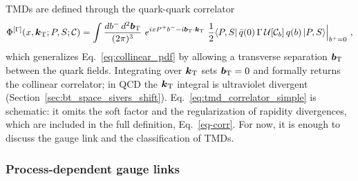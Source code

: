TMDs are defined through the quark-quark correlator
\begin{equation}
  \Phi^{[\Gamma]}(x,\boldsymbol{k}_{\mathrm T};P,S;\mathcal{C}) = \int\frac{db^-\,d^2\boldsymbol{b}_{\mathrm T}}{(2\pi)^3}\ e^{ixP^+b^- - i\boldsymbol{b}_{\mathrm T}{\cdot}\boldsymbol{k}_{\mathrm T}}\
  \frac{1}{2}\langle P,S|\,\bar{q}(0)\,\Gamma\,\mathcal{U}[\mathcal{C}_b]\,q(b)\,|P,S\rangle\Big|_{b^+=0} \ ,
  \label{eq:tmd_correlator_simple}
\end{equation}
which generalizes Eq.~\eqref{eq:collinear_pdf} by allowing a transverse separation $\boldsymbol{b}_{\mathrm T}$ between the quark fields. Integrating over $\boldsymbol{k}_{\mathrm T}$ sets $\boldsymbol{b}_{\mathrm T} = 0$ and formally returns the collinear correlator; in QCD the $\boldsymbol{k}_{\mathrm T}$ integral is ultraviolet divergent (Section~\ref{sec:bt_space_sivers_shift}). Eq.~\eqref{eq:tmd_correlator_simple} is schematic: it omits the soft factor and the regularization of rapidity divergences, which are included in the full definition, Eq.~\eqref{eq-corr}. For now, it is enough to discuss the gauge link and the classification of TMDs.

\subsubsection{Process-dependent gauge links}

